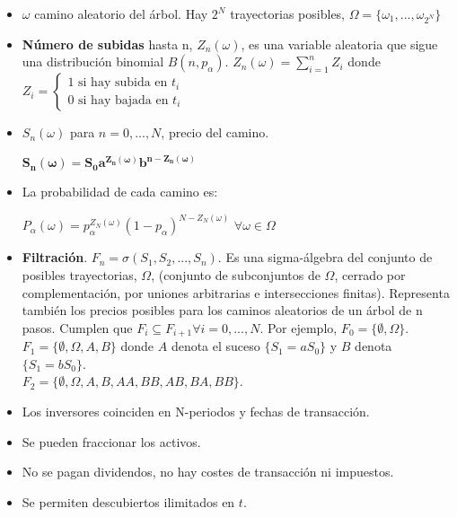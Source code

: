 \documentclass[
10pt, %
a4paper, %
oneside, %
headinclude,footinclude, %
BCOR5mm, %
]{scrartcl}
\newcommand{\n}[1]{\textbf{#1}}
\newcommand{\sub}[1]{_{#1}}
\newcommand{\pot}[1]{^{#1}}
\newcommand{\f}[1]{{\large{${#1}$}}}
\newcommand{\boldf}[1]{\f{\boldsymbol{#1}}}
\newcommand{\sumatorio}[2]{\sum_{#1}^{#2}}
\newcounter{ex}
\begin{document}
\begin{itemize}
			\item \f{\omega} camino aleatorio del árbol. Hay \f{2\pot{N}} trayectorias posibles, \f{\Omega = \{\omega\sub{1},...,\omega\sub{2\pot{N}}\}}
			\item \n{Número de subidas} hasta n, \f{Z\sub{n}(\omega)}, es una variable aleatoria que sigue una distribución binomial \f{B(n,p\sub{\alpha})}. \f{Z\sub{n}(\omega) = \sumatorio{i = 1}{n} Z\sub{i}} donde \f{Z\sub{i} = \left\{ \begin{aligned} 1 \text{ si hay subida en } t\sub{i}  \\ 0 \text{  si hay bajada en } t\sub{i} \end{aligned}}
			\item \f{S\sub{n}(\omega)} para \f{n = 0,...,N}, precio del camino. \begin{center} \boldf{S\sub{n}(\omega) = S\sub{0} a\pot{Z\sub{n}(\omega)} b\pot{n-Z\sub{n}(\omega)}} \end{center}
			\item La probabilidad de cada camino es: 
			\begin{center} \f{P\sub{\alpha}(\omega) = p\sub{\alpha}\pot{Z\sub{N}(\omega)}(1-p\sub{\alpha})\pot{N-Z\sub{N}(\omega)}} \hspace{0.3cm} \f{\forall \omega \in \Omega} \end{center}
			\item \n{Filtración}. \f{F\sub{n} = \sigma(S\sub{1},S\sub{2},...,S\sub{n})}. Es una sigma-álgebra del conjunto de posibles trayectorias, \f{\Omega}, (conjunto de subconjuntos de \f{\Omega}, cerrado por complementación, por uniones arbitrarias e intersecciones finitas). Representa también los precios posibles para los caminos aleatorios de un árbol de n pasos. Cumplen que \f{F\sub{i} \subseteq F\sub{i+1} \forall i = 0,...,N}. Por ejemplo, \f{F\sub{0} = \{\emptyset, \Omega\}}. \\ \f{F\sub{1} = \{\emptyset, \Omega, A, B\}} donde \f{A} denota el suceso \f{\{S\sub{1} = a S\sub{0}\}} y \f{B} denota \f{\{S\sub{1} = bS\sub{0}\}}. \\ \f{F\sub{2} = \{\emptyset, \Omega, A, B, AA, BB, AB, BA, BB\}}.
			
		\end{itemize}

		\begin{multicols}{2}
		\begin{itemize}
			\item Los inversores coinciden en N-periodos y fechas de transacción.
			\item Se pueden fraccionar los activos.
			\item No se pagan dividendos, no hay costes de transacción ni impuestos.
			\item Se permiten descubiertos ilimitados en \f{t}.
		\end{itemize}
		\end{multicols}
\end{document}
